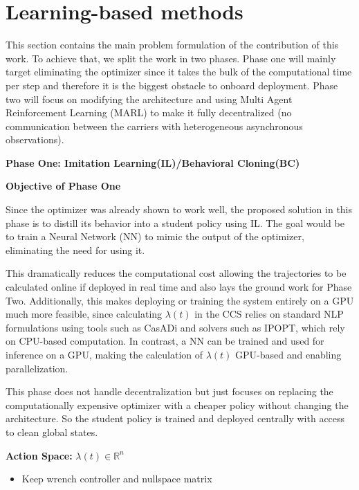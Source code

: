 \section{Learning-based methods}

This section contains the main problem formulation of the contribution of
this work. To achieve that, we split the work in two phases. Phase one
will mainly target eliminating the optimizer since it takes the bulk of
the computational time per step and therefore it is the biggest obstacle
to onboard deployment. Phase two will focus on modifying the architecture
and using Multi Agent Reinforcement Learning (MARL) to make it fully
decentralized (no communication between the carriers with heterogeneous
asynchronous observations).

\noindent\textbf{Phase One: Imitation Learning(IL)/Behavioral Cloning(BC)}

\noindent\textbf{Objective of Phase One}

Since the optimizer was already shown to work well, the proposed solution
in this phase is to distill its behavior into a student policy using IL. 
The goal would be to
train a Neural Network (NN) to mimic the output of the optimizer, eliminating
the need for using it. 

This
dramatically reduces the computational cost allowing the trajectories to be
calculated online if deployed in real time and also lays the ground work for
Phase Two. Additionally, this makes deploying or training the system entirely 
on a GPU much more feasible, since calculating \(\lambda(t)\) in the CCS 
relies on standard NLP formulations using tools such as CasADi and solvers 
such as IPOPT, which rely on CPU-based computation. In contrast, a NN can be 
trained and used for inference on a GPU, making the calculation of
\(\lambda(t)\) GPU-based and enabling parallelization.



This phase does not handle decentralization but just 
focuses on replacing the computationally expensive optimizer with a cheaper
policy without changing the architecture. So the student policy is trained 
and deployed centrally with access to clean global states. 

\noindent\textbf{Action Space:} $\lambda(t) \in \mathbb{R}^n$

\begin{itemize}
  \item Keep wrench controller and nullspace matrix
\end{itemize}

